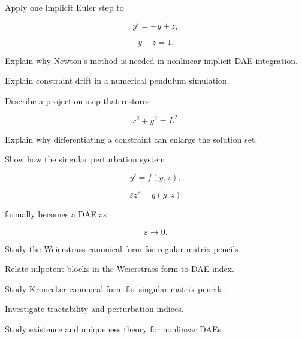 \begin{exercise}[3]
Apply one implicit Euler step to

\[
y'=-y+z,
\]

\[
y+z=1.
\]
\end{exercise}

\begin{exercise}[3]
Explain why Newton's method is needed in nonlinear implicit DAE
integration.
\end{exercise}

\begin{exercise}[3]
Explain constraint drift in a numerical pendulum simulation.
\end{exercise}

\begin{exercise}[3]
Describe a projection step that restores

\[
x^2+y^2=L^2.
\]
\end{exercise}

\begin{exercise}[3]
Explain why differentiating a constraint can enlarge the solution set.
\end{exercise}

\begin{exercise}[3]
Show how the singular perturbation system

\[
y'=f(y,z),
\]

\[
\varepsilon z'=g(y,z)
\]

formally becomes a DAE as

\[
\varepsilon\to0.
\]
\end{exercise}

\begin{exercise}[4]
Study the Weierstrass canonical form for regular matrix pencils.
\end{exercise}

\begin{exercise}[4]
Relate nilpotent blocks in the Weierstrass form to DAE index.
\end{exercise}

\begin{exercise}[4]
Study Kronecker canonical form for singular matrix pencils.
\end{exercise}

\begin{exercise}[4]
Investigate tractability and perturbation indices.
\end{exercise}

\begin{exercise}[4]
Study existence and uniqueness theory for nonlinear DAEs.
\end{exercise}

